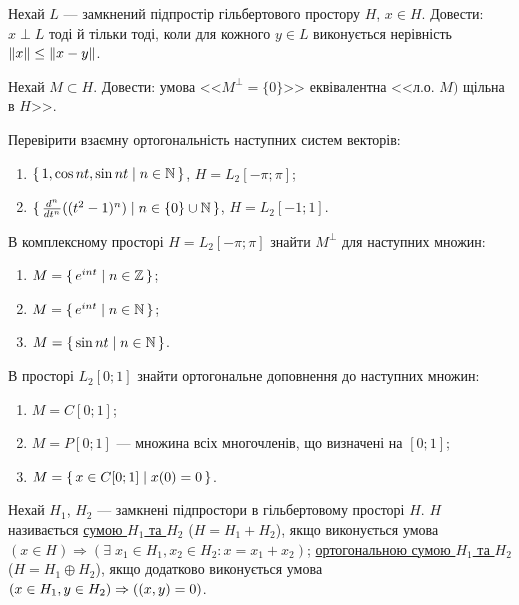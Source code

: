 \begin{exercise}
    Нехай $L$ --- замкнений підпростір гільбертового простору $H$, $x \in H$. Довести:
    $x \perp L$ тоді й тільки тоді, коли для кожного $y \in L$ виконується нерівність $\left\lVert x\right\rVert \leq \left\lVert x-y\right\rVert$.
\end{exercise}

\begin{exercise}
    Нехай $M \subset H$. Довести: умова <<$M^\perp = \{0\}$>> еквівалентна <<$\text{л.о. } M)$ щільна в $H$>>.
\end{exercise}

\begin{exercise}
    Перевірити взаємну ортогональність наступних систем векторів:
    \begin{enumerate}[label=\ukr*)]
        \item $\set{1, \cos{nt}, \sin{nt} \mid n \in \mathbb{N}}$, $H = L_2 [-\pi; \pi]$;
        \item $\set{\frac{d^n}{dt^n} ((t^2-1)^n) \mid n \in \{0 \} \cup \mathbb{N}}$, $H = L_2 [-1; 1]$.
    \end{enumerate}
\end{exercise}

\begin{exercise}
    В комплексному просторі $H = L_2 [-\pi; \pi]$ знайти $M^\perp$ для наступних множин:
    \begin{enumerate}[label=\ukr*)]
        \item $M = \set{e^{i n t} \mid n \in \mathbb{Z}}$;
        \item $M = \set{e^{i n t} \mid n \in \mathbb{N}}$;
        \item $M = \set{\sin{n t} \mid n \in \mathbb{N}}$.
    \end{enumerate}
\end{exercise}

\begin{exercise}
    В просторі $L_2 [0; 1]$ знайти ортогональне доповнення до наступних множин:
    \begin{enumerate}[label=\ukr*)]
        \item $M = C[0; 1]$;
        \item $M = P[0;1]$ --- множина всіх многочленів, що визначені на $[0; 1]$;
        \item $M = \set{ x \in C[0;1] \mid x(0) = 0}$.
    \end{enumerate}
\end{exercise}

\begin{theory}
    Нехай $H_1$, $H_2$ --- замкнені підпростори в гільбертовому просторі $H$.
    $H$ називається \uline{сумою $H_1$ та $H_2$} ($H = H_1 + H_2$), якщо виконується умова
    $(x \in H) \Rightarrow (\exists \; x_1 \in H_1, x_2 \in H_2 : x = x_1 + x_2)$;
    \uline{ортогональною сумою $H_1$ та $H_2$} ($H = H_1 \oplus H_2$), якщо додатково виконується умова
    $(x \in H_1, y \in H_2) \Rightarrow ( \left(x, y\right) = 0)$.
\end{theory}